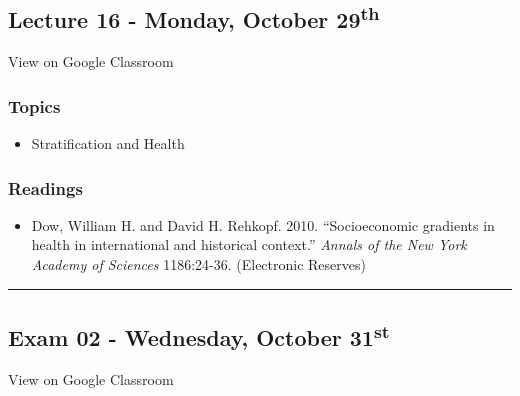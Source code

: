 \documentclass[]{book}
\providecommand{\tightlist}{%
  \setlength{\itemsep}{0pt}\setlength{\parskip}{0pt}}
\theoremstyle{definition}
\theoremstyle{definition}
\theoremstyle{definition}
\theoremstyle{remark}
\begin{document}
\hypertarget{lecture-16---monday-october-29th}{%
\subsection*{\texorpdfstring{Lecture 16 - Monday, October
29\textsuperscript{th}}{Lecture 16 - Monday, October 29th}}\label{lecture-16---monday-october-29th}}

View on Google Classroom

\hypertarget{topics-18}{%
\subsubsection*{Topics}\label{topics-18}}

\begin{itemize}
\tightlist
\item
  Stratification and Health
\end{itemize}

\hypertarget{readings-17}{%
\subsubsection*{Readings}\label{readings-17}}

\begin{itemize}
\tightlist
\item
  Dow, William H. and David H. Rehkopf. 2010. ``Socioeconomic gradients
  in health in international and historical context.'' \emph{Annals of
  the New York Academy of Sciences} 1186:24-36. (Electronic Reserves)
\end{itemize}

\begin{center}\rule{0.5\linewidth}{\linethickness}\end{center}

\hypertarget{exam-02---wednesday-october-31st}{%
\subsection*{\texorpdfstring{Exam 02 - Wednesday, October
31\textsuperscript{st}}{Exam 02 - Wednesday, October 31st}}\label{exam-02---wednesday-october-31st}}

View on Google Classroom
\end{document}
